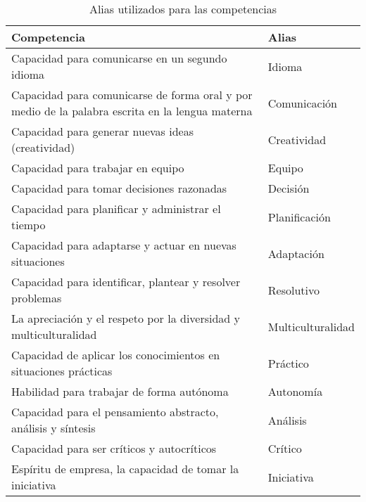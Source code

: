 \begin{table}[H]
  \begin{center}
  \begin{tabular}{| m{10cm} | l |}
    \hline
    Competencia & Alias \\
    \hline
    \hline 
    Capacidad para comunicarse en un segundo idioma & Idioma \\
    \hline
    Capacidad para comunicarse de forma oral y por medio de la palabra escrita en la lengua materna & Comunicación \\
    \hline 
    Capacidad para generar nuevas ideas (creatividad) & Creatividad\\
    \hline
    Capacidad para trabajar en equipo & Equipo \\
    \hline
    Capacidad para tomar decisiones razonadas & Decisión \\
    \hline
    Capacidad para planificar y administrar el tiempo & Planificación \\
    \hline
    Capacidad para adaptarse y actuar en nuevas situaciones & Adaptación\\
    \hline
    Capacidad para identificar, plantear y resolver problemas & Resolutivo \\
    \hline
    La apreciación y el respeto por la diversidad y multiculturalidad & Multiculturalidad\\
    \hline
    Capacidad de aplicar los conocimientos en situaciones prácticas & Práctico \\
    \hline
    Habilidad para trabajar de forma autónoma & Autonomía \\
    \hline
    Capacidad para el pensamiento abstracto, análisis y síntesis  & Análisis\\
    \hline
    Capacidad para ser críticos y autocríticos & Crítico \\
    \hline
    Espíritu de empresa, la capacidad de tomar la iniciativa & Iniciativa \\
    \hline
  \end{tabular}
\end{center}
\caption{Alias utilizados para las competencias}
\label{tab:CuadroAlias}
\end{table} 


